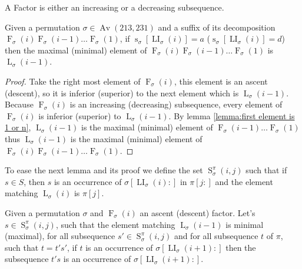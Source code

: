 \documentclass[a4paper]{llncs}
\DeclareMathOperator{\AV}{Av}
\newcommand{\ptext}{\pi}
\newcommand{\pmotif}{\sigma}
\DeclareMathOperator{\stripea}{s}
\newcommand{\stripe}[2]{\stripea_{{#1}}[{#2}]}
\newcommand{\dstep}{d}
\newcommand{\ustep}{a}
\DeclareMathOperator{\firsta}{L}
\newcommand{\first}[2]{\firsta_{{#1}}({#2})}
\DeclareMathOperator{\firstia}{LI}
\newcommand{\firsti}[2]{\firstia_{{#1}}({#2})}
\DeclareMathOperator{\factora}{F}
\newcommand{\factor}[2]{\factora_{{#1}}({#2})}
\DeclareMathOperator{\SETa}{S}
\newcommand{\SET}[4]{\SETa_{{#1}}^{{#2}}({#3},{#4})}
\begin{document}
\begin{remark}
A Factor is either an increasing or a decreasing subsequence.
\end{remark}

\begin{lemma}
\label{lemma:whereIsMax}
Given a permutation $\sigma \in \AV(213,231)$ and a suffix of its decomposition $\factor{\sigma}{i}\factor{\sigma}{i-1}\ldots\factor{\sigma}{1}$, if
$\stripe{\sigma}{\firsti{\sigma}{i}}=\ustep$ ($\stripe{\sigma}{\firsti{\sigma}{i}}=\dstep$) then the maximal (minimal) element of $\factor{\sigma}{i}\factor{\sigma}{i-1}\ldots\factor{\sigma}{1}$ is $\first{\sigma}{i-1}$.
\end{lemma}

\begin{proof}
Take the right most element of $\factor{\sigma}{i}$, this element is an ascent (descent),
so it is inferior (superior) to the next element which is $\first{\sigma}{i-1}$. Because $\factor{\sigma}{i}$ is an increasing (decreasing) subsequence, every element of $\factor{\sigma}{i}$ is inferior (superior) to $\first{\sigma}{i-1}$.
By lemma \ref{lemma:first element is 1 or n}, $\first{\sigma}{i-1}$ is the maximal (minimal) element of $\factor{\sigma}{i-1}\ldots\factor{\sigma}{1}$ thus $\first{\sigma}{i-1}$ is the maximal (minimal) element of $\factor{\sigma}{i}\factor{\sigma}{i-1}\ldots\factor{\sigma}{1}$.

\end{proof}

To ease the next lemma and its proof we define the set $\SET{\pmotif}{\ptext}{i}{j}$ such that if $s \in S$, then $s$ is an occurrence of $\pmotif[\firsti{\pmotif}{i}:]$ in $\ptext[j:]$ and the element matching $\first{\pmotif}{i}$ is $\ptext[j]$.

\begin{lemma}
Given a permutation $\pmotif$ and $\factor{\pmotif}{i}$ an ascent (descent) factor.
Let's $s \in \SET{\pmotif}{\ptext}{i}{j}$, such that the element matching $\first{\pmotif}{i-1}$ is minimal (maximal), for all subsequence 
$s' \in \SET{\pmotif}{\ptext}{i}{j}$ and for all subsequence $t$ of $\ptext$, such that $t=t's'$, if $t$ is an occurrence of $\pmotif[\firsti{\pmotif}{i+1}:]$ then the subsequence $t's$ is an occurrence of $\pmotif[\firsti{\pmotif}{i+1}:]$.
\end{lemma}
\end{document}
